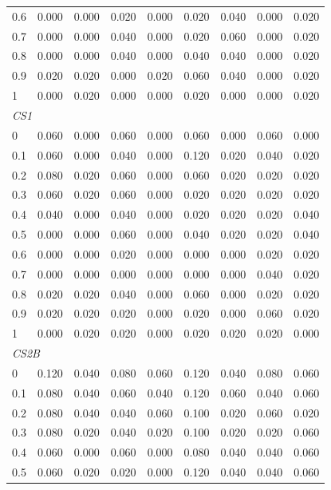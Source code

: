 \begin{table}[htbp]
\begin{tabular}{lcccccccc}
0.6 & 0.000 & 0.000 & 0.020 & 0.000 & 0.020 & 0.040 & 0.000 & 0.020 \\
0.7 & 0.000 & 0.000 & 0.040 & 0.000 & 0.020 & 0.060 & 0.000 & 0.020 \\
0.8 & 0.000 & 0.000 & 0.040 & 0.000 & 0.040 & 0.040 & 0.000 & 0.020 \\
0.9 & 0.020 & 0.020 & 0.000 & 0.020 & 0.060 & 0.040 & 0.000 & 0.020 \\
1 & 0.000 & 0.020 & 0.000 & 0.000 & 0.020 & 0.000 & 0.000 & 0.020 \\
\midrule
\multicolumn{9}{l}{\textit{CS1}} \\
0 & 0.060 & 0.000 & 0.060 & 0.000 & 0.060 & 0.000 & 0.060 & 0.000 \\
0.1 & 0.060 & 0.000 & 0.040 & 0.000 & 0.120 & 0.020 & 0.040 & 0.020 \\
0.2 & 0.080 & 0.020 & 0.060 & 0.000 & 0.060 & 0.020 & 0.020 & 0.020 \\
0.3 & 0.060 & 0.020 & 0.060 & 0.000 & 0.020 & 0.020 & 0.020 & 0.020 \\
0.4 & 0.040 & 0.000 & 0.040 & 0.000 & 0.020 & 0.020 & 0.020 & 0.040 \\
0.5 & 0.000 & 0.000 & 0.060 & 0.000 & 0.040 & 0.020 & 0.020 & 0.040 \\
0.6 & 0.000 & 0.000 & 0.020 & 0.000 & 0.000 & 0.000 & 0.020 & 0.020 \\
0.7 & 0.000 & 0.000 & 0.000 & 0.000 & 0.000 & 0.000 & 0.040 & 0.020 \\
0.8 & 0.020 & 0.020 & 0.040 & 0.000 & 0.060 & 0.000 & 0.020 & 0.020 \\
0.9 & 0.020 & 0.020 & 0.020 & 0.000 & 0.020 & 0.000 & 0.060 & 0.020 \\
1 & 0.000 & 0.020 & 0.020 & 0.000 & 0.020 & 0.020 & 0.020 & 0.000 \\
\midrule
\multicolumn{9}{l}{\textit{CS2B}} \\
0 & 0.120 & 0.040 & 0.080 & 0.060 & 0.120 & 0.040 & 0.080 & 0.060 \\
0.1 & 0.080 & 0.040 & 0.060 & 0.040 & 0.120 & 0.060 & 0.040 & 0.060 \\
0.2 & 0.080 & 0.040 & 0.040 & 0.060 & 0.100 & 0.020 & 0.060 & 0.020 \\
0.3 & 0.080 & 0.020 & 0.040 & 0.020 & 0.100 & 0.020 & 0.020 & 0.060 \\
0.4 & 0.060 & 0.000 & 0.060 & 0.000 & 0.080 & 0.040 & 0.040 & 0.060 \\
0.5 & 0.060 & 0.020 & 0.020 & 0.000 & 0.120 & 0.040 & 0.040 & 0.060 \\

\end{tabular}
\end{table}
